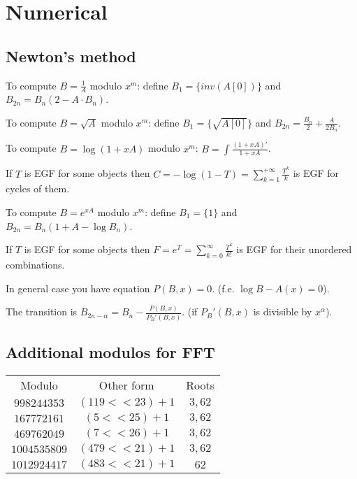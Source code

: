 \chapter{Numerical}
\section{Newton's method}
	To compute $B = \frac{1}{A}$ modulo $x^m$: define $B_1 = \{inv(A[0])\}$ and $B_{2n} = B_n (2 - A \cdot B_n)$.


	To compute $B = \sqrt{A}$ modulo $x^m$: define $B_1 = \{\sqrt{A[0]}\}$ and $B_{2n} = \frac{B_n}{2} + \frac{A}{2B_n}$.


	To compute $B = \log (1 + xA)$ modulo $x^m$: $B = \int\frac{(1 + xA)'}{1 + xA}$.

	If $T$ is EGF for some objects then $C = -\log (1 - T) = \sum_{k = 1}^{+\infty} \frac{T^k}{k}$ is EGF for cycles of them.


	To compute $B = e^{xA}$ modulo $x^m$: define $B_1 = \{1\}$ and $B_{2n} = B_n(1 + A - \log B_n)$.

	If $T$ is EGF for some objects then $F = e^T = \sum_{k = 0}^{\infty} \frac{T^k}{k!}$ is EGF for their unordered combinations.

	In general case you have equation $P(B, x) = 0$. (f.e. $\log B - A(x) = 0$).

	The transition is $B_{2n - \alpha} = B_n - \frac{P(B, x)}{P_B'(B, x)}$. (if $P_B'(B, x)$ is divisible by $x^\alpha$).
\section{Additional modulos for FFT}
\begin{center}
	\begin{tabular}{ c | c | c }
		Modulo & Other form & Roots \\
		$998244353$ & $(119 << 23) + 1$ & $3, 62$ \\
		$167772161$ & $(5 << 25) + 1$ & $3, 62$ \\
		$469762049$ & $(7 << 26) + 1$ & $3, 62$ \\
		$1004535809$ & $(479 << 21) + 1$ & $3, 62$ \\
		$1012924417$ & $(483 << 21) + 1$ & $62$ \\

	\end{tabular}
\end{center}

